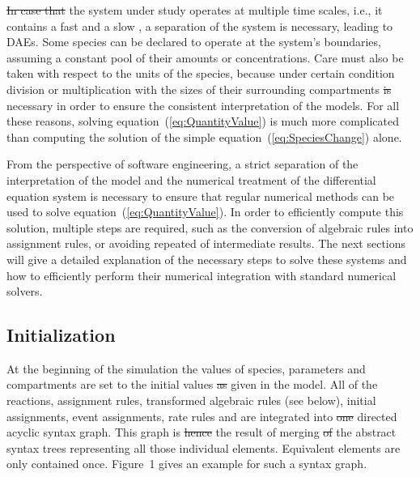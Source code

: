 \documentclass[10pt]{bmc_article}
\newenvironment{bmcformat}{\fussy\setboolean{publ}{true}}{\fussy}
\begin{document}
\begin{bmcformat}
\sout{In case that} the system under study operates at multiple time
scales, i.e., it contains a fast and a slow , a separation of the
system is necessary, leading to \acfp{DAE}.
Some species can be declared to operate at the system's boundaries, assuming a
constant pool of their amounts or concentrations.
Care must also be taken with respect to the units of the species, because under
certain condition division or multiplication with the sizes of their surrounding
compartments \sout{is} necessary in order to ensure the consistent interpretation of
the models. 
For all these reasons, solving equation~(\ref{eq:QuantityValue}) is much more 
complicated than computing the solution of the simple equation~(\ref{eq:SpeciesChange})
alone.

From the perspective of software engineering, a strict separation of the 
interpretation of the model and the numerical treatment of the differential
equation system is necessary to ensure that regular numerical methods can be used
to solve equation~(\ref{eq:QuantityValue}).
In order to efficiently compute this solution, multiple  steps are
required, such as the conversion of algebraic rules into assignment rules, or
avoiding repeated  of intermediate results.
The next sections will give a detailed explanation of the necessary steps to
solve these systems and how to efficiently perform their numerical integration
with standard numerical solvers.


\subsection*{Initialization}

At the beginning of the simulation the values of species, parameters and
compartments are set to the initial values \sout{as} given in the model.
All  of the reactions, assignment rules, transformed algebraic
rules (see below), initial assignments, event assignments, rate rules and
 are integrated into \sout{one} directed
acyclic syntax graph.
This graph is \sout{hence}
the result of merging \sout{of} the abstract syntax trees representing
all those individual elements.
Equivalent elements are only contained once.
Figure~1 gives an example for such a syntax graph.


\end{bmcformat}
\end{document}
